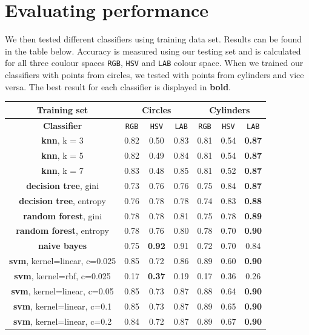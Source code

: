 \documentclass[12pt,a4paper]{article}
\begin{document}
	\section{Evaluating performance}

	We then tested different classifiers using training data set. Results can be found in the table below. Accuracy is measured using our testing set and is calculated for all three coulour spaces \texttt{RGB}, \texttt{HSV} and \texttt{LAB} colour space. When we trained our classifiers with points from circles, we tested with points from cylinders and vice versa. The best result for each classifier is displayed in \textbf{bold}.
	
	\begin{center}
		\begin{tabular}{|c|c|c|c||c|c|c|}
			\hline
			Training set & \multicolumn{3}{c||}{\textbf{Circles}} & \multicolumn{3}{c|}{\textbf{Cylinders}} \\
			\hline
			\hline 
			\textbf{Classifier} & \texttt{RGB} & \texttt{HSV} & \texttt{LAB} & \texttt{RGB} & \texttt{HSV} & \texttt{LAB} \\
			\hline \hline
			\textbf{knn}, \small k = 3 & 0.82 & 0.50 & 0.83 & 0.81 & 0.54 & \textbf{0.87} \\
			\textbf{knn}, \small k = 5 & 0.82 & 0.49 & 0.84 & 0.81 & 0.54 & \textbf{0.87} \\
			\textbf{knn}, \small k = 7 & 0.83 & 0.48 & 0.85 & 0.81 & 0.52 & \textbf{0.87} \\
			\hline \hline
			\textbf{decision tree}, \small gini & 0.73 & 0.76 & 0.76 & 0.75 & 0.84 & \textbf{0.87} \\
			\textbf{decision tree}, \small entropy & 0.76 & 0.78 & 0.78 & 0.74 & 0.83 & \textbf{0.88} \\
			\hline \hline
			\textbf{random forest}, \small gini & 0.78 & 0.78 & 0.81 & 0.75 & 0.78 & \textbf{0.89} \\
			\textbf{random forest}, \small entropy & 0.78 & 0.76 & 0.80 & 0.78 & 0.70 & \textbf{0.90} \\
			\hline \hline
			\textbf{naive bayes} & 0.75 & \textbf{0.92} & 0.91 & 0.72 & 0.70 & 0.84 \\
			\hline \hline
			\textbf{svm}, \small kernel=linear, c=0.025 & 0.85 & 0.72 & 0.86 & 0.89 & 0.60 & \textbf{0.90} \\
			\textbf{svm}, \small kernel=rbf, c=0.025 & 0.17 & \textbf{0.37} & 0.19 & 0.17 & 0.36 & 0.26 \\
			\textbf{svm}, \small kernel=linear, c=0.05 & 0.85 & 0.73 & 0.87 & 0.88 & 0.64 & \textbf{0.90} \\
			\textbf{svm}, \small kernel=linear, c=0.1 & 0.85 & 0.73 & 0.87 & 0.89 & 0.65 & \textbf{0.90} \\
			\textbf{svm}, \small kernel=linear, c=0.2 & 0.84 & 0.72 & 0.87 & 0.89 & 0.67 & \textbf{0.90} \\
			\hline
		\end{tabular} \\
	\end{center}
\end{document}
